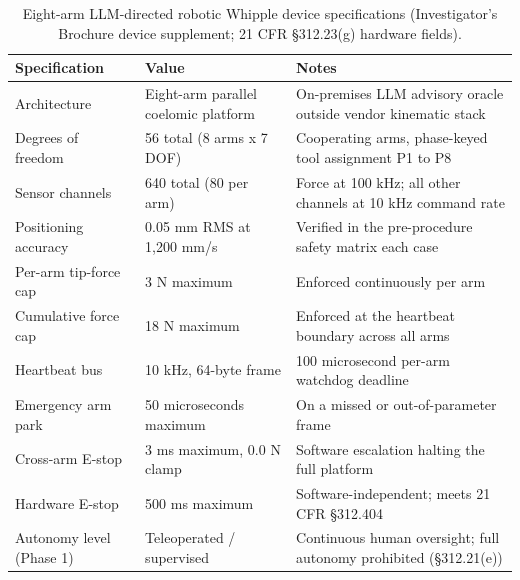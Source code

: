 \begin{table}[t]
\caption{Eight-arm LLM-directed robotic Whipple device specifications (Investigator's Brochure device supplement; 21 CFR \S 312.23(g) hardware fields).}
\label{tab:sec04-device}
\centering
\begin{tabularx}{\textwidth}{L{4.2cm} L{4.4cm} Y}
\toprule
\textbf{Specification} & \textbf{Value} & \textbf{Notes} \\
\midrule
Architecture & Eight-arm parallel coelomic platform & On-premises LLM advisory oracle outside vendor kinematic stack \\
Degrees of freedom & 56 total (8 arms x 7 DOF) & Cooperating arms, phase-keyed tool assignment P1 to P8 \\
Sensor channels & 640 total (80 per arm) & Force at 100 kHz; all other channels at 10 kHz command rate \\
Positioning accuracy & 0.05 mm RMS at 1,200 mm/s & Verified in the pre-procedure safety matrix each case \\
Per-arm tip-force cap & 3 N maximum & Enforced continuously per arm \\
Cumulative force cap & 18 N maximum & Enforced at the heartbeat boundary across all arms \\
Heartbeat bus & 10 kHz, 64-byte frame & 100 microsecond per-arm watchdog deadline \\
Emergency arm park & 50 microseconds maximum & On a missed or out-of-parameter frame \\
Cross-arm E-stop & 3 ms maximum, 0.0 N clamp & Software escalation halting the full platform \\
Hardware E-stop & 500 ms maximum & Software-independent; meets 21 CFR \S 312.404 \\
Autonomy level (Phase 1) & Teleoperated / supervised & Continuous human oversight; full autonomy prohibited (\S 312.21(e)) \\
\bottomrule
\end{tabularx}
\vspace*{-0.2cm}
\end{table}

